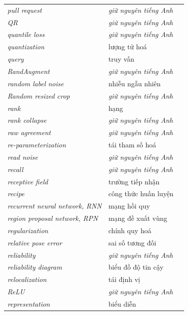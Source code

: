 \documentclass[deep_learning.tex]{subfiles}
\begin{document}
\begin{longtable}{@{}L{5.2cm}L{5.9cm}L{2.6cm}@{}}
\emph{pull request} & \emph{\color{tiercol}giữ nguyên tiếng Anh} & \\
\emph{QR} & \emph{\color{tiercol}giữ nguyên tiếng Anh} & \\
\emph{quantile loss} & \emph{\color{tiercol}giữ nguyên tiếng Anh} & \\
\emph{quantization} & lượng tử hoá & \\
\emph{query} & truy vấn & \\
\emph{RandAugment} & \emph{\color{tiercol}giữ nguyên tiếng Anh} & \\
\emph{random label noise} & nhiễu ngẫu nhiên & \\
\emph{Random resized crop} & \emph{\color{tiercol}giữ nguyên tiếng Anh} & \\
\emph{rank} & hạng & \\
\emph{rank collapse} & \emph{\color{tiercol}giữ nguyên tiếng Anh} & \\
\emph{raw agreement} & \emph{\color{tiercol}giữ nguyên tiếng Anh} & \\
\emph{re-parameterization} & tái tham số hoá & \\
\emph{read noise} & \emph{\color{tiercol}giữ nguyên tiếng Anh} & \\
\emph{recall} & \emph{\color{tiercol}giữ nguyên tiếng Anh} & \\
\emph{receptive field} & trường tiếp nhận & \\
\emph{recipe} & công thức huấn luyện & \\
\emph{recurrent neural network, RNN} & mạng hồi quy & \\
\emph{region proposal network, RPN} & mạng đề xuất vùng & \\
\emph{regularization} & chính quy hoá & \\
\emph{relative pose error} & sai số tương đối & \\
\emph{reliability} & \emph{\color{tiercol}giữ nguyên tiếng Anh} & \\
\emph{reliability diagram} & biểu đồ độ tin cậy & \\
\emph{relocalization} & tái định vị & \\
\emph{ReLU} & \emph{\color{tiercol}giữ nguyên tiếng Anh} & \\
\emph{representation} & biểu diễn & \\

\end{longtable}
\end{document}
